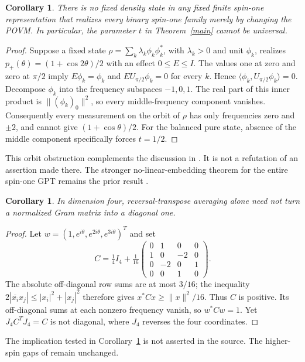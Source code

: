 \documentclass[11pt]{article}
\newtheorem{corollary}[theorem]{Corollary}
\begin{document}
\begin{corollary}\label{fixedstate}
There is no fixed density state in any fixed finite spin-one representation
that realizes every binary spin-one family merely by changing the POVM.
In particular, the parameter $t$ in Theorem~\ref{main} cannot be universal.
\end{corollary}
\begin{proof}
Suppose a fixed state $\rho=\sum_k\lambda_k\phi_k\phi_k^*$, with
$\lambda_k>0$ and unit $\phi_k$, realizes
$p_+(\theta)=(1+\cos2\theta)/2$ with an effect $0\leq E\leq I$.
The values one at zero and zero at $\pi/2$ imply
$E\phi_k=\phi_k$ and $EU_{\pi/2}\phi_k=0$ for every $k$.
Hence $\langle\phi_k,U_{\pi/2}\phi_k\rangle=0$.
Decompose $\phi_k$ into the frequency subspaces $-1,0,1$.
The real part of this inner product is $\|(\phi_k)_0\|^2$, so every
middle-frequency component vanishes. Consequently every measurement on
the orbit of $\rho$ has only frequencies zero and $\pm2$, and cannot give
$(1+\cos\theta)/2$. For the balanced pure state, absence of the middle
component specifically forces $t=1/2$.
\end{proof}
This orbit obstruction complements the discussion in \cite[\S IV.B.3]{AGJLM}.
It is not a refutation of an assertion made there. The stronger
no-linear-embedding theorem for the entire spin-one GPT remains the
prior result \cite[Lemma~18]{AGJLM}.

\begin{corollary}\label{boundary}
In dimension four, reversal-transpose averaging alone need not turn a
normalized Gram matrix into a diagonal one.
\end{corollary}
\begin{proof}
Let $w=(1,e^{i\theta},e^{2i\theta},e^{3i\theta})^T$ and set
\[
 C=\tfrac14 I_4+\tfrac1{16}
 \begin{pmatrix}0&1&0&0\\1&0&-2&0\\0&-2&0&1\\0&0&1&0\end{pmatrix}.
\]
The absolute off-diagonal row sums are at most $3/16$; the inequality
$2|\overline{x_i}x_j|\leq|x_i|^2+|x_j|^2$ therefore gives
$x^*Cx\geq\|x\|^2/16$. Thus $C$ is positive. Its off-diagonal sums
at each nonzero frequency vanish, so $w^*Cw=1$. Yet $J_4 C^T J_4=C$
is not diagonal, where $J_4$ reverses the four coordinates.
\end{proof}
The implication tested in Corollary~\ref{boundary} is not asserted in the
source. The higher-spin gaps of \cite[\S IV.C]{AGJLM} remain unchanged.
\end{document}

